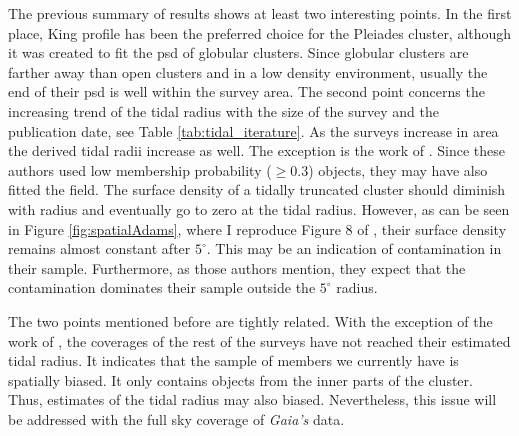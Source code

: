 The previous summary of results shows at least two interesting points. In the first place, King profile \citep{King1962} has been the preferred choice for the Pleiades cluster, although it was created to fit the \gls{psd} of globular clusters. Since globular clusters are farther away than open clusters and in a low density environment, usually the end of their \gls{psd} is well within the survey area. The second point concerns the increasing trend of the tidal radius with the size of the survey and the publication date, see Table \ref{tab:tidal_iterature}. As the surveys increase in area the derived tidal radii increase as well. The exception is the work of \citet{Adams2001}. Since these authors used low membership probability ($\geq0.3$) objects, they may have also fitted the field. The surface density of a tidally truncated cluster should diminish with radius and eventually go to zero at the tidal radius. However, as can be seen in Figure \ref{fig:spatialAdams}, where I reproduce Figure 8 of \citet{Adams2001}, their surface density remains almost constant after $5^{\circ}$. This may be an indication of contamination in their sample. Furthermore, as those authors mention, they expect that the contamination dominates their sample outside the $5^{\circ}$ radius.

The two points mentioned before are tightly related. With the exception of the work of \citet{Adams2001}, the coverages of the rest of the surveys have not reached their estimated tidal radius. It indicates that the sample of members we currently have is spatially biased. It only contains objects from the inner parts of the cluster. Thus, estimates of the tidal radius may also biased. Nevertheless, this issue will be addressed with the full sky coverage of \emph{Gaia's} data.

